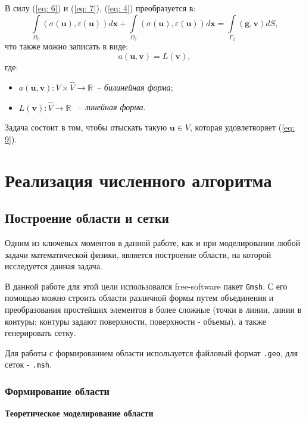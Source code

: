 \documentclass[a4paper, 14pt]{extreport}
\begin{document}
В силу (\ref{eq: 6}) и (\ref{eq: 7}), (\ref{eq: 4}) преобразуется в:
\begin{equation}
	\label{eq: 8}
	\int\limits_{\Omega_0}{(\sigma(\textbf{u}), \varepsilon(\textbf{u}))}d\textbf{x} + 
	\int\limits_{\Omega_1}{(\sigma(\textbf{u}), \varepsilon(\textbf{u}))}d\textbf{x} = 
		\int\limits_{\Gamma_2}{(\textbf{g}, \textbf{v})}dS,
\end{equation}
что также можно записать в виде:
\begin{equation}
	\label{eq: 9}
	a(\textbf{u}, \textbf{v}) = L(\textbf{v}),
\end{equation}
где:
\begin{itemize}
	\item $a(\textbf{u}, \textbf{v}) : V \times \hat{V} \rightarrow \mathbb{R}$ \,-- \textit{билинейная форма};
	\item $L(\textbf{v}) : \hat{V} \rightarrow \mathbb{R}$ \, -- \textit{линейная форма}.
\end{itemize}

Задача состоит в том, чтобы отыскать такую  $\textbf{u} \in V$, 
которая удовлетворяет (\ref{eq: 9}).


\chapter{Реализация численного алгоритма}
\section{Построение области и сетки}

Одним из ключевых моментов в данной работе, как и при моделировании 
любой задачи математической физики, является построение области, 
на которой исследуется данная задача.

В данной работе для этой цели использовался free-software
пакет \texttt{Gmsh}. С его помощью можно строить 
области различной формы путем объединения и преобразования
простейших элементов в более сложные (точки в линии, линии в контуры;
контуры задают поверхности, поверхности - объемы), а также генерировать 
сетку.

Для работы с формированием области используется файловый формат 
\texttt{.geo}, для сеток - \texttt{.msh}.
\subsection{Формирование области}
\textbf{Теоретическое моделирование области}
\end{document}
